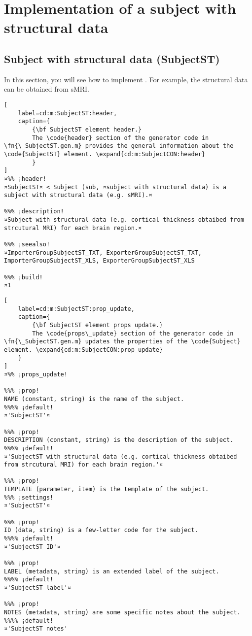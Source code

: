 \documentclass{tufte-handout}
\begin{document}
\clearpage

\section{Implementation of a subject with structural data}

\subsection{Subject with structural data (SubjectST)}

In this section, you will see how to implement . For example, the structural data can be obtained from sMRI.

\begin{lstlisting}[
	label=cd:m:SubjectST:header,
	caption={
		{\bf SubjectST element header.}
		The \code{header} section of the generator code in \fn{\_SubjectST.gen.m} provides the general information about the \code{SubjectST} element. \expand{cd:m:SubjectCON:header}
		}
]
¤%% ¡header!
¤SubjectST¤ < Subject (sub, ¤subject with structural data) is a subject with structural data (e.g. sMRI).¤

%%% ¡description!
¤Subject with structural data (e.g. cortical thickness obtaibed from strcutural MRI) for each brain region.¤

%%% ¡seealso!
¤ImporterGroupSubjectST_TXT, ExporterGroupSubjectST_TXT, ImporterGroupSubjectST_XLS, ExporterGroupSubjectST_XLS

%%% ¡build!
¤1
\end{lstlisting}

\begin{lstlisting}[
	label=cd:m:SubjectST:prop_update,
	caption={
		{\bf SubjectST element props update.}
		The \code{props\_update} section of the generator code in \fn{\_SubjectST.gen.m} updates the properties of the \code{Subject} element. \expand{cd:m:SubjectCON:prop_update}
	}
]
¤%% ¡props_update!

%%% ¡prop!
NAME (constant, string) is the name of the subject.
%%%% ¡default!
¤'SubjectST'¤

%%% ¡prop!
DESCRIPTION (constant, string) is the description of the subject.
%%%% ¡default!
¤'SubjectST with structural data (e.g. cortical thickness obtaibed from strcutural MRI) for each brain region.'¤

%%% ¡prop!
TEMPLATE (parameter, item) is the template of the subject.
%%% ¡settings!
¤'SubjectST'¤

%%% ¡prop!
ID (data, string) is a few-letter code for the subject.
%%%% ¡default!
¤'SubjectST ID'¤

%%% ¡prop!
LABEL (metadata, string) is an extended label of the subject.
%%%% ¡default!
¤'SubjectST label'¤

%%% ¡prop!
NOTES (metadata, string) are some specific notes about the subject.
%%%% ¡default!
¤'SubjectST notes'
\end{lstlisting}
\end{document}
